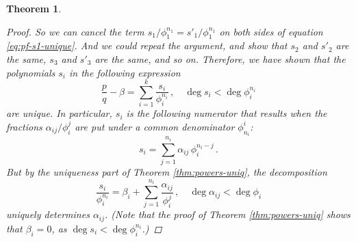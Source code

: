 \documentclass[12pt]{article}
\newtheorem{thm}{Theorem}
\begin{document}
\begin{thm}
\begin{proof}
So we can cancel the term $s_1/\phi_1^{n_1} = s'_1/\phi_1^{n_1}$ 
on both sides of 
equation \eqref{eq:pf-s1-unique}.
  And we could repeat the argument,
and show that $s_2$ and $s'_2$ are the same, 
$s_3$ and $s'_3$ are the same, and so on.
Therefore, we have shown that
the polynomials $s_i$ in the following expression
\[
\frac{p}{q} - \beta = \sum_{i=1}^k \frac{s_i}{\phi_i^{n_i}}\,, \quad \deg s_i < \deg \phi_i^{n_i}
\]
are unique.  In particular, $s_i$ is
the following numerator that results when the fractions $\alpha_{ij}/\phi_i^j$
are put under a common denominator $\phi^i_{n_i}$:
\[
s_i = \sum_{j=1}^{n_i} \alpha_{ij} \, \phi_i^{n_i-j}\,.
\]
But by the uniqueness part of Theorem \ref{thm:powers-uniq},
the decomposition
\[
\frac{s_i}{\phi_i^{n_i}} = \beta_i + \sum_{j=1}^{n_i} \frac{\alpha_{ij}}{\phi_i^j}\,, \quad \deg \alpha_{ij} < \deg \phi_i
\]
uniquely determines $\alpha_{ij}$.
(Note that the proof of Theorem \ref{thm:powers-uniq} shows that
$\beta_i = 0$, as $\deg s_i < \deg \phi_i^{n_i}$.)
\end{proof}
\end{thm}
\end{document}
